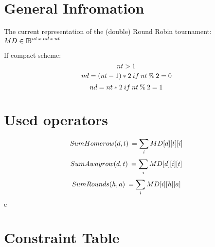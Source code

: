 \documentclass[•]{article}
\begin{document}
\section{General Infromation}
The current representation of the (double) Round Robin tournament: ${MD \in \rm I\!B}^{nt\: x\: nd\: x\: nt}$

If compact scheme:
\[\large nt > 1 \]
\[\large nd = (nt-1) * 2\: if\: nt \:\% \:2 = 0\]
\[\large nd = nt * 2\: if\: nt \:\% \:2 = 1\]

\section{Used operators}
\[\large SumHomerow(d,t)\:= \sum_i MD[d][t][i]\]
\[\large SumAwayrow(d,t)\:= \sum_i MD[d][i][t]\]
\[\large SumRounds(h,a)\:= \sum_i MD[i][h][a]\]e 




\section{Constraint Table}
\noindent%
\end{document}
